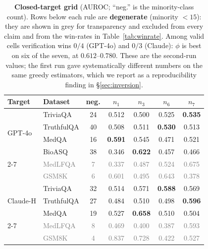 \documentclass[11pt]{article}
\newcommand{\grey}[1]{\textcolor{gray}{#1}}
\newcommand{\nverb}{$n_1$}     %
\newcommand{\nphi}{$n_3$}      %
\newcommand{\nyn}{$n_6$}       %
\newcommand{\nsc}{$n_7$}       %
\begin{document}
\begin{table}[t]
\centering\small
\begin{tabular}{llccccc}
\toprule
Target & Dataset & neg. & \nverb & \nphi & \nyn & \nsc \\
\midrule
\multirow{4}{*}{GPT-4o}
 & TriviaQA   & 24 & 0.512 & 0.500 & 0.525 & \textbf{0.535} \\
 & TruthfulQA & 40 & 0.508 & 0.511 & \textbf{0.530} & 0.513 \\
 & MedQA      & 16 & \textbf{0.591} & 0.545 & 0.471 & 0.521 \\
 & BioASQ     & 38 & 0.346 & \textbf{0.622} & 0.457 & 0.466 \\
\cmidrule(l){2-7}
 & \grey{MedLFQA}  & \grey{7} & \grey{0.337} & \grey{0.487} & \grey{0.524} & \grey{0.675} \\
 & \grey{GSM8K}    & \grey{6} & \grey{0.601} & \grey{0.495} & \grey{0.643} & \grey{0.378} \\
\midrule
\multirow{3}{*}{Claude-H}
 & TriviaQA   & 32 & 0.514 & 0.571 & \textbf{0.588} & 0.569 \\
 & TruthfulQA & 27 & 0.484 & 0.510 & 0.498 & \textbf{0.596} \\
 & MedQA      & 19 & 0.527 & \textbf{0.658} & 0.510 & 0.504 \\
\cmidrule(l){2-7}
 & \grey{MedLFQA}  & \grey{8} & \grey{0.469} & \grey{0.400} & \grey{0.387} & \grey{0.593} \\
 & \grey{GSM8K}    & \grey{4} & \grey{0.837} & \grey{0.728} & \grey{0.422} & \grey{0.527} \\
\bottomrule
\end{tabular}
\caption{\textbf{Closed-target grid} (AUROC; ``neg.'' is the minority-class count). Rows below
each rule are \textbf{degenerate} (minority $<15$): they are shown in grey for transparency and
excluded from every claim and from the win-rates in Table~\ref{tab:winrate}. Among valid cells verification wins
$0/4$ (GPT-4o) and $0/3$ (Claude): $\phi$ is best on six of the seven, at $0.612$--$0.780$.
These are the second-run values; the first run gave systematically different numbers on the same
greedy estimators, which we report as a reproducibility finding in \S\ref{sec:inversion}.}
\label{tab:closed}
\end{table}
\end{document}
